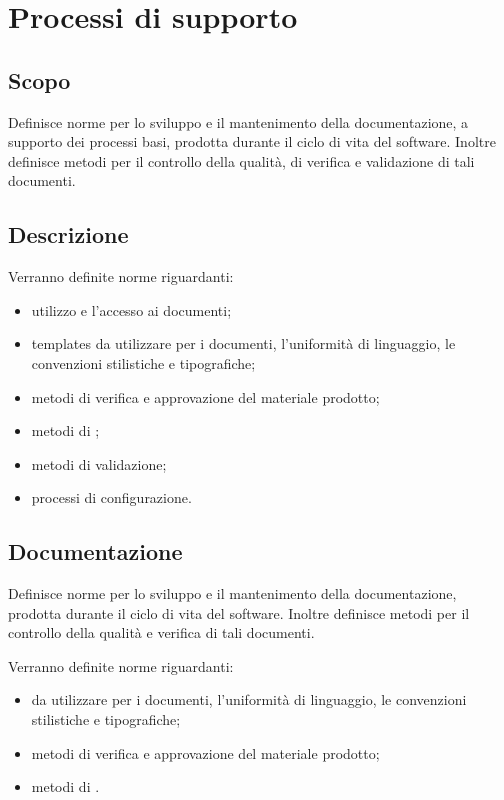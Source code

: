 \documentclass[12pt,a4paper]{article}
\begin{document}
\newpage

\section{Processi di supporto}

\subsection{Scopo}
Definisce norme per lo sviluppo e il mantenimento della documentazione, a supporto dei processi basi, prodotta durante il ciclo di vita del software. Inoltre definisce metodi per il controllo della qualità, di verifica e validazione di tali documenti.

\subsection{Descrizione}
Verranno definite norme riguardanti:
\begin{itemize}
	\item utilizzo e l'accesso ai documenti;
	\item templates da utilizzare per i documenti, l'uniformità di linguaggio, le convenzioni stilistiche e tipografiche;
	\item metodi di verifica e approvazione del materiale prodotto;
	\item metodi di ;
	\item metodi di validazione;
	\item processi di configurazione.
\end{itemize}

\subsection{Documentazione}\label{Documentazione}
Definisce norme per lo sviluppo e il mantenimento della documentazione, prodotta durante il ciclo di vita del software. Inoltre definisce metodi per il controllo della qualità e verifica di tali documenti.

Verranno definite norme riguardanti:
\begin{itemize}
	\item {} da utilizzare per i documenti, l'uniformità di linguaggio, le convenzioni stilistiche e tipografiche;
	\item metodi di verifica e approvazione del materiale prodotto;
	\item metodi di .
\end{itemize}
\end{document}
